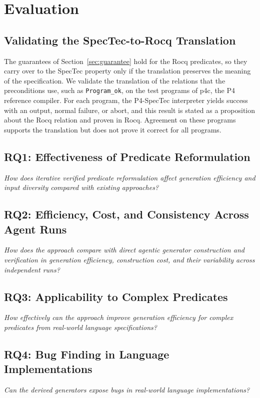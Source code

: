 \section{Evaluation}
\label{sec:evaluation}

\subsection{Validating the SpecTec-to-Rocq Translation}
\label{sec:translation-correctness}

The guarantees of Section~\ref{sec:guarantee} hold for the Rocq predicates, so
they carry over to the SpecTec property only if the translation preserves the
meaning of the specification.
We validate the translation of the relations that the preconditions use, such
as \texttt{Program\_ok}, on the test programs of p4c, the P4 reference compiler.
For each program, the P4-SpecTec interpreter yields success with an output,
normal failure, or abort, and this result is stated as a proposition about the
Rocq relation and proven in Rocq.
Agreement on these programs supports the translation but does not prove it
correct for all programs.

\subsection{RQ1: Effectiveness of Predicate Reformulation}

\emph{How does iterative verified predicate reformulation affect generation
efficiency and input diversity compared with existing approaches?}

\subsection{RQ2: Efficiency, Cost, and Consistency Across Agent Runs}

\emph{How does the approach compare with direct agentic generator construction
and verification in generation efficiency, construction cost, and their
variability across independent runs?}

\subsection{RQ3: Applicability to Complex Predicates}

\emph{How effectively can the approach improve generation efficiency for complex
predicates from real-world language specifications?}

\subsection{RQ4: Bug Finding in Language Implementations}

\emph{Can the derived generators expose bugs in real-world language
implementations?}
